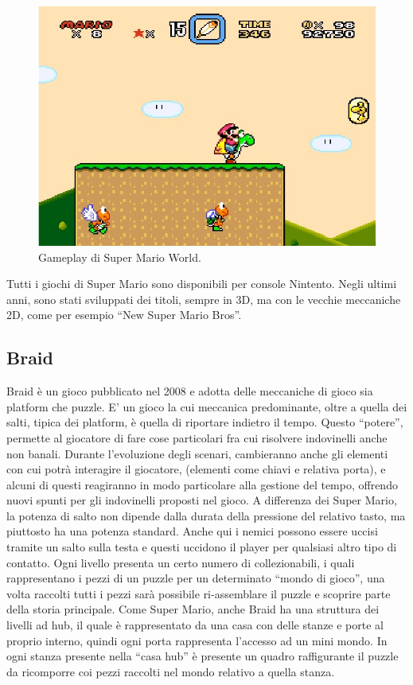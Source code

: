 \begin{figure}[h]
\centerline{\includegraphics[scale=0.50]{images/statoarte/smwgameplay.jpg}}
\caption{Gameplay di Super Mario World.}
\label{fig:smwgameplay}
\end{figure}

Tutti i giochi di Super Mario sono disponibili per console Nintento. Negli ultimi anni, sono stati sviluppati dei titoli, sempre in 3D, ma con le vecchie meccaniche 2D, come per esempio ``New Super Mario Bros''.



\subsection{Braid}

Braid è un gioco pubblicato nel 2008 e adotta delle meccaniche di gioco sia platform che puzzle. E' un gioco la cui meccanica predominante, oltre a quella dei salti, tipica dei platform, è quella di riportare indietro il tempo. Questo ``potere'', permette al giocatore di fare cose particolari fra cui risolvere indovinelli anche non banali. Durante l'evoluzione degli scenari, cambieranno anche gli elementi con cui potrà interagire il giocatore, (elementi come chiavi e relativa porta), e alcuni di questi reagiranno in modo particolare alla gestione del tempo, offrendo nuovi spunti per gli indovinelli proposti nel gioco. A differenza dei Super Mario, la potenza di salto non dipende dalla durata della pressione del relativo tasto, ma piuttosto ha una potenza standard. Anche qui i nemici possono essere uccisi tramite un salto sulla testa e questi uccidono il player per qualsiasi altro tipo di contatto. Ogni livello presenta un certo numero di collezionabili, i quali rappresentano i pezzi di un puzzle per un determinato ``mondo di gioco'', una volta raccolti tutti i pezzi sarà possibile ri-assemblare il puzzle e scoprire parte della storia principale. Come Super Mario, anche Braid ha una struttura dei livelli ad hub, il quale è rappresentato da una casa con delle stanze e porte al proprio interno, quindi ogni porta rappresenta l'accesso ad un mini mondo. In ogni stanza presente nella ``casa hub'' è presente un quadro raffigurante il puzzle da ricomporre coi pezzi raccolti nel mondo relativo a quella stanza.

